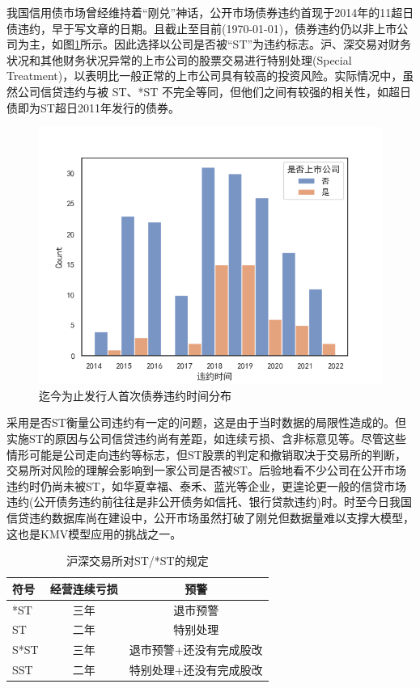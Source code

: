 \documentclass[a4paper,12pt]{ctexart}
\begin{document}
我国信用债市场曾经维持着“刚兑”神话，公开市场债券违约首现于2014年的11超日债违约，早于\citet{彭伟2012基于}写文章的日期。且截止至目前(\today)，债券违约仍以非上市公司为主，如图\ref{fig:default}所示。因此\citet{彭伟2012基于}选择以公司是否被“ST”为违约标志。沪、深交易对财务状况和其他财务状况异常的上市公司的股票交易进行特别处理(Special Treatment)，以表明比一般正常的上市公司具有较高的投资风险。实际情况中，虽然公司信贷违约与被 ST、*ST 不完全等同，但他们之间有较强的相关性，如超日债即为ST超日2011年发行的债券。
\begin{figure}[H]
    \centering
    \includegraphics[width=\linewidth]{img/发行人首次债券违约.png}
    \caption{迄今为止发行人首次债券违约时间分布}\label{fig:default}
\end{figure}

采用是否ST衡量公司违约有一定的问题，这是由于当时数据的局限性造成的。但实施ST的原因与公司信贷违约尚有差距，如连续亏损、含非标意见等。尽管这些情形可能是公司走向违约等标志，但ST股票的判定和撤销取决于交易所的判断，交易所对风险的理解会影响到一家公司是否被ST。后验地看不少公司在公开市场违约时仍尚未被ST，如华夏幸福、泰禾、蓝光等企业，更遑论更一般的信贷市场违约(公开债务违约前往往是非公开债务如信托、银行贷款违约)时。时至今日我国信贷违约数据库尚在建设中，公开市场虽然打破了刚兑但数据量难以支撑大模型，这也是KMV模型应用的挑战之一。
\begin{table}[H]
    \centering
    \begin{tabular}{lcc}
        \toprule
        符号   & 经营连续亏损 & 预警           \\
        \midrule
        *ST  & 三年     & 退市预警         \\
        ST   & 二年     & 特别处理         \\
        S*ST & 三年     & 退市预警+还没有完成股改 \\
        SST  & 二年     & 特别处理+还没有完成股改 \\
        \bottomrule
    \end{tabular}
    \caption{沪深交易所对ST/*ST的规定}
\end{table}
\end{document}
